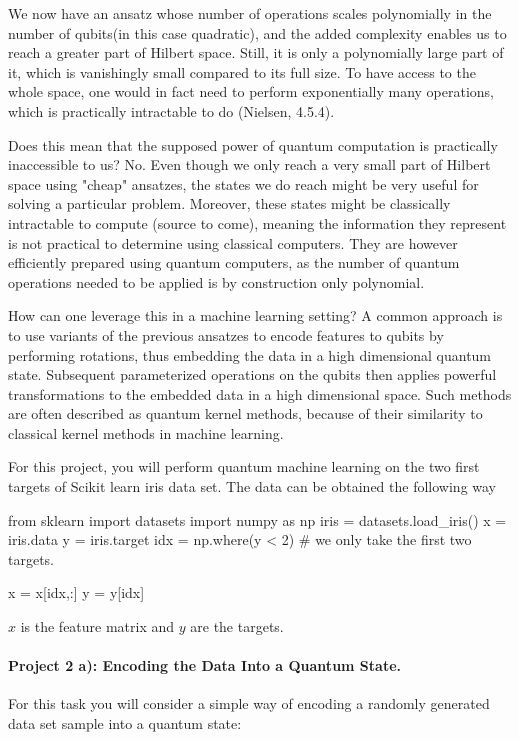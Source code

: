 \documentclass[%
oneside,                 %
final,                   %
10pt]{article}
\begin{document}
We now have an ansatz whose number of operations scales polynomially in the number of qubits(in this case quadratic), and the
added complexity enables us to reach a greater part of Hilbert space. Still, it is only a polynomially large part of it, which
is vanishingly small compared to its full size. To have access to the whole space, one would in fact need to perform exponentially
many operations, which is practically intractable to do (Nielsen, 4.5.4).

Does this mean that the supposed power of quantum computation is practically inaccessible to us? No. Even though we
only reach a very small part of Hilbert space using "cheap" ansatzes, the states we do reach might be very useful
for solving a particular problem. Moreover, these states might be classically intractable to compute (source to come),
meaning the information they represent is not practical to determine using classical computers. They are however efficiently
prepared using quantum computers, as the number of quantum operations needed to be applied is by construction only polynomial.

How can one leverage this in a machine learning setting? A common approach is to use variants of the previous ansatzes to encode features to qubits by performing rotations, thus embedding the data in a high dimensional quantum state. Subsequent parameterized operations on the qubits then applies powerful transformations to the embedded data in a high dimensional space. Such methods are often described as quantum kernel methods, because of their similarity to classical kernel methods in machine learning.

For this project, you will perform quantum machine learning on the two first targets of Scikit learn iris data set. The data can be obtained the following way











\bpycod
from sklearn import datasets
import numpy as np
iris = datasets.load_iris()
x = iris.data
y = iris.target
idx = np.where(y < 2) # we only take the first two targets.

x = x[idx,:]
y = y[idx]

\epycod

$x$ is the feature matrix and $y$ are the targets.

\paragraph{Project 2 a): Encoding the Data Into a Quantum State.}
For this task you will consider a simple way of encoding a randomly generated data set sample into a quantum state:
\end{document}
